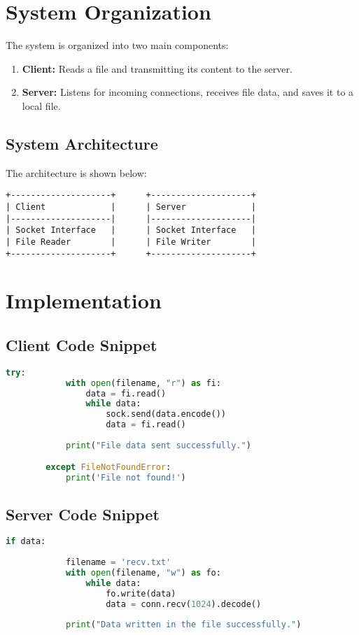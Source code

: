 \documentclass[a4paper,12pt]{article}
\begin{document}
\section*{System Organization}
The system is organized into two main components:
\begin{enumerate}
    \item \textbf{Client:} Reads a file and transmitting its content to the server.
    \item \textbf{Server:} Listens for incoming connections, receives file data, and saves it to a local file.
\end{enumerate}

\subsection*{System Architecture}
The architecture is shown below:
\begin{verbatim}
+--------------------+      +--------------------+
| Client             |      | Server             |
|--------------------|      |--------------------|
| Socket Interface   |      | Socket Interface   |
| File Reader        |      | File Writer        |
+--------------------+      +--------------------+
\end{verbatim}

\section*{Implementation}


\subsection*{Client Code Snippet}
\begin{lstlisting}[language=python]
try:
            with open(filename, "r") as fi:
                data = fi.read()
                while data:
                    sock.send(data.encode())
                    data = fi.read()
            
            print("File data sent successfully.")

        except FileNotFoundError:
            print('File not found!')

\end{lstlisting}

\subsection*{Server Code Snippet}
\begin{lstlisting}[language=python]
if data:
           
            filename = 'recv.txt'
            with open(filename, "w") as fo:
                while data:
                    fo.write(data)
                    data = conn.recv(1024).decode()
            
            print("Data written in the file successfully.")

\end{lstlisting}
\end{document}
